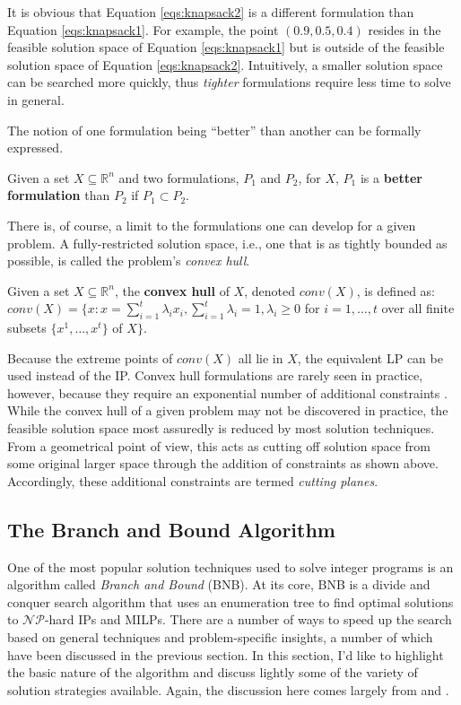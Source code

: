 It is obvious that Equation \ref{eqs:knapsack2} is a different formulation than
Equation \ref{eqs:knapsack1}. For example, the point $(0.9, 0.5, 0.4)$ resides
in the feasible solution space of Equation \ref{eqs:knapsack1} but is outside of
the feasible solution space of Equation \ref{eqs:knapsack2}. Intuitively, a
smaller solution space can be searched more quickly, thus \textit{tighter}
formulations require less time to solve in general.

The notion of one formulation being ``better'' than another can be formally
expressed.

\begin{define}
Given a set $X \subseteq \mathbb{R}^n$ and two formulations, $P_1$ and $P_2$,
for $X$, $P_1$ is a \textbf{better formulation} than $P_2$ if $P_1 \subset P_2$.
\end{define}

There is, of course, a limit to the formulations one can develop for a given
problem. A fully-restricted solution space, i.e., one that is as tightly bounded
as possible, is called the problem's \textit{convex hull}. 

\begin{define}
Given a set $X \subseteq \mathbb{R}^n$, the \textbf{convex hull} of $X$, denoted
$conv(X)$, is defined as: $conv(X) = \{x : x = \sum_{i=1}^{t} \lambda_i
x_i, \sum_{i=1}^{t} \lambda_i = 1, \lambda_i \geq 0$ for $i = 1, \ldots, t$ over
all finite subsets $\{x^1, \ldots, x^t \}$ of $X\}$.
\end{define}

Because the extreme points of $conv(X)$ all lie in $X$, the equivalent LP can be
used instead of the IP. Convex hull formulations are rarely seen in practice,
however, because they require an exponential number of additional
constraints \cite{wolsey_integer_1998}. While the convex hull of a given problem
may not be discovered in practice, the feasible solution space most assuredly is
reduced by most solution techniques. From a geometrical point of view, this acts
as cutting off solution space from some original larger space through the
addition of constraints as shown above. Accordingly, these additional
constraints are termed \textit{cutting planes}.

\subsection{The Branch and Bound Algorithm}\label{sec:bnb}

One of the most popular solution techniques used to solve integer programs is an
algorithm called \textit{Branch and Bound} (BNB). At its core, BNB is a divide
and conquer search algorithm that uses an enumeration tree to find optimal
solutions to $\mathcal{NP}$-hard IPs and MILPs. There are a number of ways to
speed up the search based on general techniques and problem-specific insights, a
number of which have been discussed in the previous section. In this section,
I'd like to highlight the basic nature of the algorithm and discuss lightly some
of the variety of solution strategies available. Again, the discussion here
comes largely from \cite{wolsey_integer_1998} and \cite{luedtke_class_2010}.

